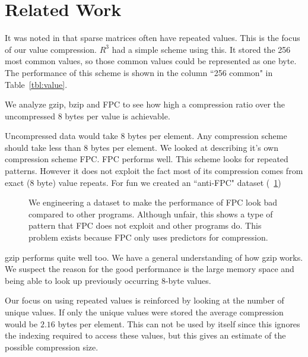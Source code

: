 \section{Related Work}
\label{sec:fziprelated}
It was noted in \cite{prelim:kourtis} that sparse matrices often have repeated values. This is the focus of our value compression. $R^3$ had a simple scheme using this. It stored the 256 most common values, so those common values could be represented as one byte. The performance of this scheme is shown in the column ``256 common" in Table~\ref{tbl:value}.\par
We analyze gzip, bzip and FPC to see how high a compression ratio over the uncompressed 8 bytes per value is achievable.\par
Uncompressed data would take 8 bytes per element. Any compression scheme should take less than 8 bytes per element. We looked at \cite{prelim:burtscher} describing it's own compression scheme FPC. FPC performs well. This scheme looks for repeated patterns. However it does not exploit the fact most of its compression comes from exact (8 byte) value repeats. For fun we created an ``anti-FPC" dataset (\figurename~\ref{fig:antiFpc})\\
\begin{figure}
    \center
{}
\caption[Anti-FPC]{We engineering a dataset to make the performance of FPC look bad compared to other programs. Although unfair, this shows a type of pattern that FPC does not exploit and other programs do. This problem exists because FPC only uses predictors for compression.}
\label{fig:antiFpc}
\end{figure}
\indent gzip performs quite well too. We have a general understanding of how gzip works. We suspect the reason for the good performance is the large memory space and being able to look up previously occurring 8-byte values.\par
\indent Our focus on using repeated values is reinforced by looking at the number of unique values. If only the unique values were stored the average compression would be $2.16$ bytes per element. This can not be used by itself since this ignores the indexing required to access these values, but this gives an estimate of the possible compression size.\par
